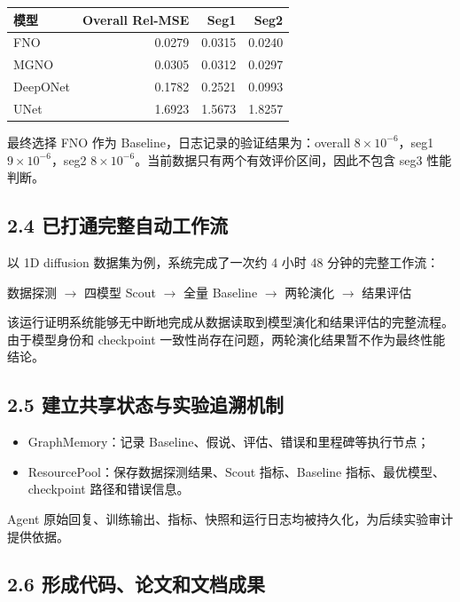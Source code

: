 \documentclass[UTF8,a4paper,zihao=-4]{ctexart}
\begin{document}
\begin{table}[H]
\centering
\begin{tabular}{|l|r|r|r|}
\hline
\textbf{模型} & \textbf{Overall Rel-MSE} & \textbf{Seg1} & \textbf{Seg2} \\
\hline
FNO & 0.0279 & 0.0315 & 0.0240 \\
\hline
MGNO & 0.0305 & 0.0312 & 0.0297 \\
\hline
DeepONet & 0.1782 & 0.2521 & 0.0993 \\
\hline
UNet & 1.6923 & 1.5673 & 1.8257 \\
\hline
\end{tabular}
\end{table}

最终选择 FNO 作为 Baseline，日志记录的验证结果为：overall \(8\times10^{-6}\)，seg1 \(9\times10^{-6}\)，seg2 \(8\times10^{-6}\)。当前数据只有两个有效评价区间，因此不包含 seg3 性能判断。

\subsection*{2.4 已打通完整自动工作流}

以 1D diffusion 数据集为例，系统完成了一次约 4 小时 48 分钟的完整工作流：

\begin{center}
数据探测 \(\rightarrow\) 四模型 Scout \(\rightarrow\) 全量 Baseline
\(\rightarrow\) 两轮演化 \(\rightarrow\) 结果评估
\end{center}

该运行证明系统能够无中断地完成从数据读取到模型演化和结果评估的完整流程。由于模型身份和 checkpoint 一致性尚存在问题，两轮演化结果暂不作为最终性能结论。

\subsection*{2.5 建立共享状态与实验追溯机制}

\begin{itemize}[leftmargin=2em]
\item GraphMemory：记录 Baseline、假说、评估、错误和里程碑等执行节点；
\item ResourcePool：保存数据探测结果、Scout 指标、Baseline 指标、最优模型、checkpoint 路径和错误信息。
\end{itemize}

Agent 原始回复、训练输出、指标、快照和运行日志均被持久化，为后续实验审计提供依据。

\subsection*{2.6 形成代码、论文和文档成果}
\end{document}
